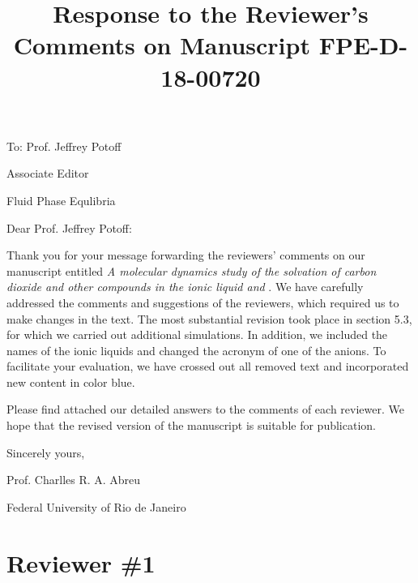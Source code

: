 \documentclass[]{article}
\title{\normalsize \textbf{Response to the Reviewer’s Comments on Manuscript FPE-D-18-00720}}
\author{}
\date{}
\begin{document}
\doublespacing
\maketitle

To: Prof. Jeffrey Potoff

Associate Editor

Fluid Phase Equlibria
\vspace{0.3cm}

Dear Prof. Jeffrey Potoff:

\hspace{0.5cm}Thank you for your message forwarding the reviewers’ comments on our manuscript entitled \textit{A molecular dynamics study of the solvation of carbon dioxide and other compounds in the ionic liquid \ce{[emim][B(CN)_4]} and \ce{[emim][Tf_2N]}}. We have carefully addressed the comments and suggestions of the reviewers, which required us to make changes in the text. The most substantial revision took place in section 5.3, for which we carried out additional simulations. In addition, we included the names of the ionic liquids and changed the acronym of one of the anions. To facilitate
your evaluation, we have crossed out all removed text and incorporated new content in color blue.

\hspace{0.5cm}Please find attached our detailed answers to the comments of each reviewer. We
hope that the revised version of the manuscript is suitable for publication.

\hspace{0.5cm}Sincerely yours,
\vspace{0.5cm}

Prof. Charlles R. A. Abreu

Federal University of Rio de Janeiro

\section{\textbf{Reviewer \#1}}
{}
\end{document}

